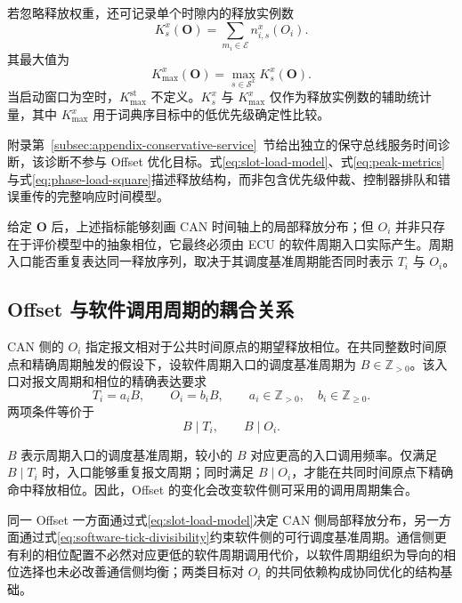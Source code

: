 \documentclass[UTF8,a4paper,twoside,zihao=-4]{ctexart}
\numberwithin{equation}{section}
\numberwithin{figure}{section}
\numberwithin{table}{section}
\theoremstyle{definition}
\newcommand{\Sset}{\mathcal{S}}
\newcommand{\Eset}{\mathcal{E}}
\numberwithin{algocf}{section}
\begin{document}
若忽略释放权重，还可记录单个时隙内的释放实例数
\begin{equation}
 K_s^{x}(\symbf O)
 =\sum_{m_i\in\Eset}n_{i,s}^{x}(O_i).
\label{eq:slot-release-multiplicity}
\end{equation}
其最大值为
\begin{equation}
 K_{\max}^{x}(\symbf O)
 =\max_{s\in\Sset^x}K_s^{x}(\symbf O).
\label{eq:max-release-multiplicity}
\end{equation}
当启动窗口为空时，$K_{\max}^{\mathrm{st}}$ 不定义。$K_s^x$ 与 $K_{\max}^x$ 仅作为释放实例数的辅助统计量，其中 $K_{\max}^x$ 用于词典序目标中的低优先级确定性比较。

附录第~\ref{subsec:appendix-conservative-service}~节给出独立的保守总线服务时间诊断，该诊断不参与 Offset 优化目标。式\eqref{eq:slot-load-model}、式\eqref{eq:peak-metrics}与式\eqref{eq:phase-load-square}描述释放结构，而非包含优先级仲裁、控制器排队和错误重传的完整响应时间模型。

给定 $\symbf O$ 后，上述指标能够刻画 CAN 时间轴上的局部释放分布；但 $O_i$ 并非只存在于评价模型中的抽象相位，它最终必须由 ECU 的软件周期入口实际产生。周期入口能否重复表达同一释放序列，取决于其调度基准周期能否同时表示 $T_i$ 与 $O_i$。

\subsection{Offset 与软件调用周期的耦合关系}

CAN 侧的 $O_i$ 指定报文相对于公共时间原点的期望释放相位。在共同整数时间原点和精确周期触发的假设下，设软件周期入口的调度基准周期为 $B\in\mathbb Z_{>0}$。该入口对报文周期和相位的精确表达要求
\begin{equation}
 T_i=a_iB,\qquad O_i=b_iB,
 \qquad
 a_i\in\mathbb Z_{>0},\quad b_i\in\mathbb Z_{\ge0}.
\label{eq:software-period-multiple}
\end{equation}
两项条件等价于
\begin{equation}
 B\mid T_i,\qquad B\mid O_i.
\label{eq:software-tick-divisibility}
\end{equation}

$B$ 表示周期入口的调度基准周期，较小的 $B$ 对应更高的入口调用频率。仅满足 $B\mid T_i$ 时，入口能够重复报文周期；同时满足 $B\mid O_i$，才能在共同时间原点下精确命中释放相位。因此，Offset 的变化会改变软件侧可采用的调用周期集合。

同一 Offset 一方面通过式\eqref{eq:slot-load-model}决定 CAN 侧局部释放分布，另一方面通过式\eqref{eq:software-tick-divisibility}约束软件侧的可行调度基准周期。通信侧更有利的相位配置不必然对应更低的软件周期调用代价，以软件周期组织为导向的相位选择也未必改善通信侧均衡；两类目标对 $O_i$ 的共同依赖构成协同优化的结构基础。
\end{document}

